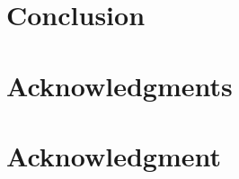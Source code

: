 \documentclass[10pt,journal,compsoc]{IEEEtran}
\begin{document}




\section{Conclusion}



%
\ifCLASSOPTIONcompsoc
  \section*{Acknowledgments}
\else
  \section*{Acknowledgment}
\fi
\end{document}
